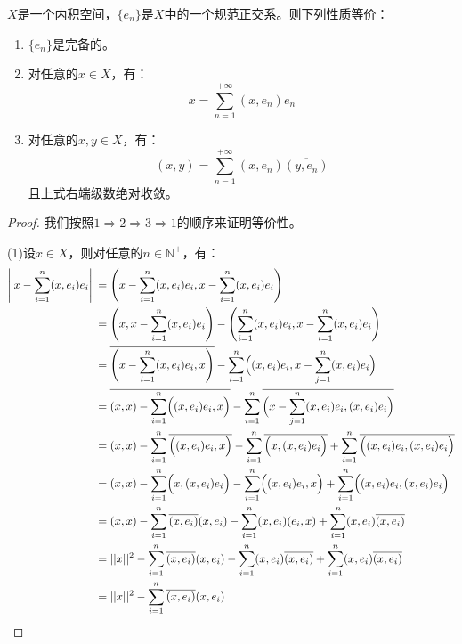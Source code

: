 \begin{theorem}
	$X$是一个内积空间，$\{e_n\}$是$X$中的一个规范正交系。则下列性质等价：
	\begin{enumerate}
		\item $\{e_n\}$是完备的。
		\item 对任意的$x\in X$，有：
		\begin{equation*}
			x=\sum_{n=1}^{+\infty}(x,e_n)e_n
		\end{equation*}
		\item 对任意的$x,y\in X$，有：
		\begin{equation*}
			(x,y)=\sum_{n=1}^{+\infty}(x,e_n)\overline{(y,e_n)}
		\end{equation*}
		且上式右端级数绝对收敛。
	\end{enumerate}
\end{theorem}
\begin{proof}
	我们按照$1\Rightarrow2\Rightarrow3\Rightarrow1$的顺序来证明等价性。\par
	(1)设$x\in X$，则对任意的$n\in\mathbb{N}^+$，有：
	\begin{align*}
		\left\|x-\sum_{i=1}^{n}(x,e_i)e_i\right\|
		&=\left(x-\sum_{i=1}^{n}(x,e_i)e_i,x-\sum_{i=1}^{n}(x,e_i)e_i\right) \\
		&=\left(x,x-\sum_{i=1}^{n}(x,e_i)e_i\right)-\left(\sum_{i=1}^{n}(x,e_i)e_i,x-\sum_{i=1}^{n}(x,e_i)e_i\right) \\
		&=\overline{\left(x-\sum_{i=1}^{n}(x,e_i)e_i,x\right)}-\sum_{i=1}^{n}\Bigl((x,e_i)e_i,x-\sum_{j=1}^{n}(x,e_i)e_i\Bigr) \\
		&=\overline{(x,x)-\sum_{i=1}^n\Bigl((x,e_i)e_i,x\Bigr)}-\sum_{i=1}^{n}\overline{\Bigl(x-\sum_{j=1}^{n}(x,e_i)e_i,(x,e_i)e_i\Bigr)} \\
		&=(x,x)-\sum_{i=1}^{n}\overline{\Bigl((x,e_i)e_i,x\Bigr)}-\sum_{i=1}^{n}\overline{\Bigl(x,(x,e_i)e_i\Bigr)}+\sum_{i=1}^{n}\overline{\Bigl((x,e_i)e_i,(x,e_i)e_i\Bigr)} \\
		&=(x,x)-\sum_{i=1}^{n}\Bigl(x,(x,e_i)e_i\Bigr)-\sum_{i=1}^{n}\Bigl((x,e_i)e_i,x\Bigr)+\sum_{i=1}^{n}\Bigl((x,e_i)e_i,(x,e_i)e_i\Bigr) \\
		&=(x,x)-\sum_{i=1}^{n}\overline{(x,e_i)}(x,e_i)-\sum_{i=1}^{n}(x,e_i)(e_i,x)+\sum_{i=1}^{n}(x,e_i)\overline{(x,e_i)} \\
		&=||x||^2-\sum_{i=1}^{n}\overline{(x,e_i)}(x,e_i)-\sum_{i=1}^{n}(x,e_i)\overline{(x,e_i)}+\sum_{i=1}^{n}(x,e_i)\overline{(x,e_i)} \\
		&=||x||^2-\sum_{i=1}^{n}\overline{(x,e_i)}(x,e_i) \\

\end{align*}
\end{proof}
